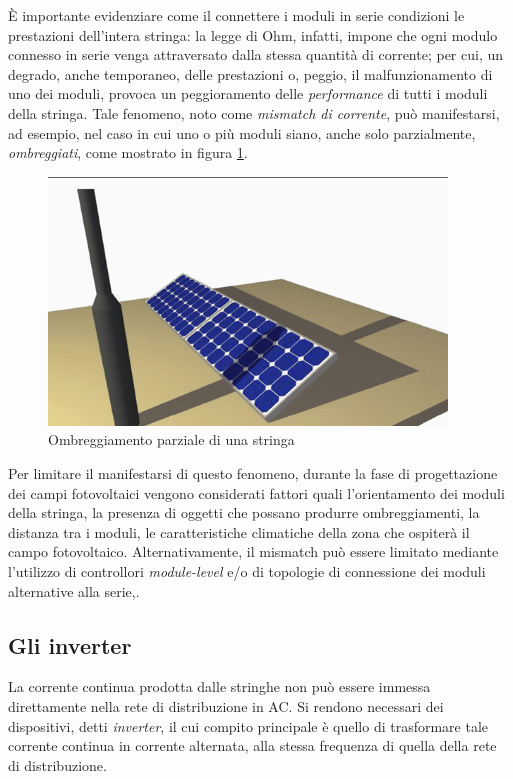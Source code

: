 %
\`E importante evidenziare come il connettere i moduli in serie condizioni le 
prestazioni dell'intera stringa: la legge di Ohm, infatti, impone che ogni 
modulo connesso in serie venga attraversato dalla stessa quantit\`a di corrente;
per cui, un degrado, anche temporaneo, delle prestazioni o, peggio, il 
malfunzionamento di uno dei moduli, provoca un peggioramento delle \emph{performance}
di tutti i moduli della stringa.
%
Tale fenomeno, noto come \emph{mismatch di corrente}, pu\`o manifestarsi,
ad esempio, nel caso in cui uno o pi\`u moduli siano, anche solo parzialmente, 
\emph{ombreggiati}, come mostrato in figura \ref{ombreggiamento}.
%
\begin{figure}[!h]
\centering
\includegraphics[width=300pt]{img/fv-ombreggiamento.png}
\caption{Ombreggiamento parziale di una stringa}
\label{ombreggiamento}
\end{figure}
%

%
Per limitare il manifestarsi di questo fenomeno, durante la fase di progettazione 
dei campi fotovoltaici vengono considerati fattori quali  l'orientamento 
dei moduli della stringa,  la presenza di oggetti che possano produrre 
ombreggiamenti,  la distanza tra i moduli,  le caratteristiche 
climatiche della zona che ospiter\`a il campo fotovoltaico.
%
Alternativamente, il mismatch pu\`o essere limitato mediante l'utilizzo di 
controllori \emph{module-level} e/o di topologie di connessione dei moduli 
alternative alla serie\cite{roman06},\cite{sung09}.
%

%
\subsection{Gli inverter}
La corrente continua prodotta dalle stringhe non pu\`o essere immessa direttamente 
nella rete di distribuzione in AC. Si rendono necessari dei dispositivi, detti \emph{inverter}, 
il cui compito principale \`e quello di trasformare tale corrente continua in corrente alternata, 
alla stessa frequenza di quella della rete di distribuzione.
%

